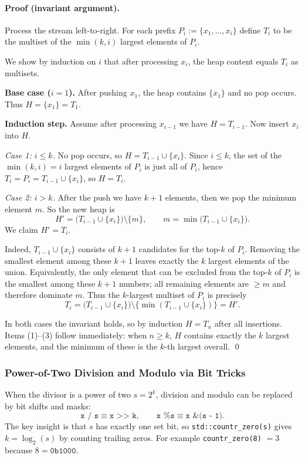 \documentclass{article}
\begin{document}
\paragraph{Proof (invariant argument).}
Process the stream left-to-right.
For each prefix $P_i := \{x_1,\dots,x_i\}$ define $T_i$ to be the multiset of the
$\min(k,i)$ largest elements of $P_i$.

We show by induction on $i$ that after processing $x_i$, the heap content equals $T_i$ as multisets.

\textbf{Base case ($i=1$).}
After pushing $x_1$, the heap contains $\{x_1\}$ and no pop occurs.
Thus $H = \{x_1\} = T_1$.

\textbf{Induction step.}
Assume after processing $x_{i-1}$ we have $H = T_{i-1}$.
Now insert $x_i$ into $H$.

\emph{Case 1: $i \le k$.}
No pop occurs, so $H = T_{i-1} \cup \{x_i\}$.
Since $i \le k$, the set of the $\min(k,i)=i$ largest elements of $P_i$ is just all of $P_i$,
hence $T_i = P_i = T_{i-1} \cup \{x_i\}$, so $H=T_i$.

\emph{Case 2: $i > k$.}
After the push we have $k+1$ elements, then we pop the minimum element $m$.
So the new heap is
\[
H' = \bigl(T_{i-1} \cup \{x_i\}\bigr) \setminus \{m\},
\qquad m = \min\bigl(T_{i-1} \cup \{x_i\}\bigr).
\]
We claim $H' = T_i$.

Indeed, $T_{i-1} \cup \{x_i\}$ consists of $k+1$ candidates for the top-$k$ of $P_i$.
Removing the smallest element among these $k+1$ leaves exactly the $k$ largest elements of the union.
Equivalently, the only element that can be excluded from the top-$k$ of $P_i$ is the smallest among
these $k+1$ numbers; all remaining elements are $\ge m$ and therefore dominate $m$.
Thus the $k$-largest multiset of $P_i$ is precisely
\[
T_i = \bigl(T_{i-1} \cup \{x_i\}\bigr) \setminus \{\min(T_{i-1} \cup \{x_i\})\} = H'.
\]

In both cases the invariant holds, so by induction $H = T_n$ after all insertions.
Items (1)--(3) follow immediately: when $n \ge k$, $H$ contains exactly the $k$ largest elements,
and the minimum of these is the $k$-th largest overall.
\qed

\subsubsection{Power-of-Two Division and Modulo via Bit Tricks}
When the divisor is a power of two $s = 2^k$, division and modulo can be replaced by bit shifts and masks:
\[
    \texttt{x / s} \equiv \texttt{x >> k}, \qquad \texttt{x \% s} \equiv \texttt{x \& (s - 1)}.
\]
The key insight is that $s$ has exactly one set bit, so \texttt{std::countr\_zero(s)} gives $k = \log_2(s)$ by counting trailing zeros. For example \texttt{countr\_zero(8)} $= 3$ because $8 = \texttt{0b1000}$.
\end{document}
